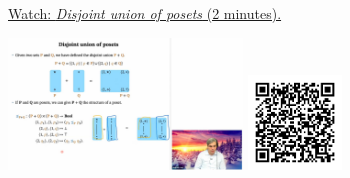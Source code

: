 
\begin{minipage}{10cm}
    \href{https://act4e-spring21.netlify.app/videos/spring2021-tradeoffs:tradeoffs:orders:composing-posets:disj-poset.html}{Watch: \emph{Disjoint union of posets} (2 minutes).}
        
    \href{https://act4e-spring21.netlify.app/videos/spring2021-tradeoffs:tradeoffs:orders:composing-posets:disj-poset.html}{\includegraphics[height=3.5cm]{spring2021-tradeoffs:tradeoffs:orders:composing-posets:disj-poset/thumbnails.jpg}}
    \href{https://act4e-spring21.netlify.app/videos/spring2021-tradeoffs:tradeoffs:orders:composing-posets:disj-poset.html}{\includegraphics[height=2.5cm]{spring2021-tradeoffs:tradeoffs:orders:composing-posets:disj-poset/qrcode.png}}
\end{minipage}
